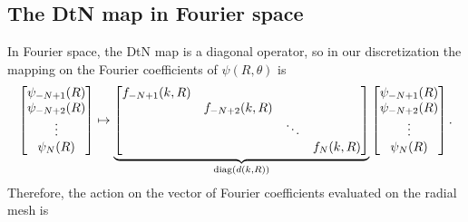 \subsection{The DtN map in Fourier space}

In Fourier space, the DtN map is a diagonal operator, so
in our discretization the mapping on the Fourier coefficients
of $\psi(R,\theta)$ is 
\begin{align*}
 \begin{bmatrix}
  \psi_{-N+1}(R) \\ \psi_{-N+2}(R) \\ \vdots \\ \psi_N(R)
 \end{bmatrix}
 \mapsto
 \underbrace{
 \begin{bmatrix}
  f_{-N+1}(k,R) &               &        & \\
                & f_{-N+2}(k,R) &        & \\ 
                &               & \ddots & \\ 
                &               &        & f_N(k,R)
 \end{bmatrix}
 }_{\operatorname{diag}\left(d(k,R)\right)}
 \begin{bmatrix}
  \psi_{-N+1}(R) \\ \psi_{-N+2}(R) \\ \vdots \\ \psi_N(R)
 \end{bmatrix}.
\end{align*}
Therefore, the action on the vector of Fourier coefficients evaluated
on the radial mesh is
